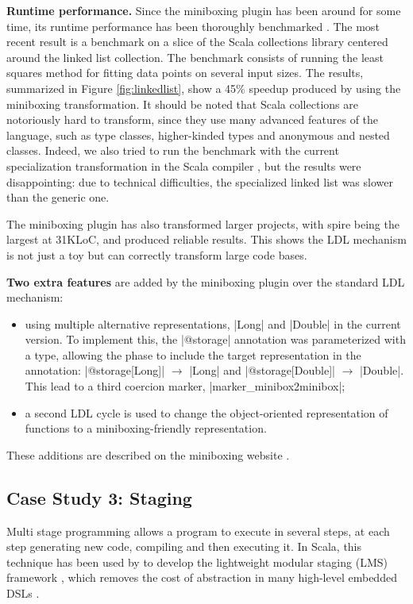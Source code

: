\textbf{Runtime performance.} Since the miniboxing plugin has been around for some time, its runtime performance has been thoroughly benchmarked \cite{miniboxing}. The most recent result is a benchmark on a slice of the Scala collections library \cite{miniboxing-linkedlist} centered around the linked list collection. The benchmark consists of running the least squares method for fitting data points on several input sizes. The results, summarized in Figure \ref{fig:linkedlist}, show a 45\% speedup produced by using the miniboxing transformation. It should be noted that Scala collections are notoriously hard to transform, since they use many advanced features of the language, such as type classes, higher-kinded types and anonymous and nested classes. Indeed, we also tried to run the benchmark with the current specialization transformation in the Scala compiler \cite{iuli-thesis}, but the results were disappointing: due to technical difficulties, the specialized linked list was slower than the generic one.

The miniboxing plugin \cite{miniboxing-www} has also transformed larger projects, with spire \cite{erik-spire} being the largest at 31KLoC, and produced reliable results. This shows the LDL mechanism is not just a toy but can correctly transform large code bases.

\textbf{Two extra features} are added by the miniboxing plugin over the standard LDL mechanism:
\begin{itemize}
\item using multiple alternative representations, |Long| and |Double| in the current version. To implement this, the |@storage| annotation was parameterized with a type, allowing the \inject{} phase to include the target representation in the annotation: |@storage[Long]| $\rightarrow$ |Long| and |@storage[Double]| $\rightarrow$ |Double|. This lead to a third coercion marker, |marker_minibox2minibox|;
\item a second LDL cycle is used to change the object-oriented representation of functions to a miniboxing-friendly representation.
\end{itemize}
These additions are described on the miniboxing website \cite{miniboxing-www}.

\subsection{Case Study 3: Staging}
\label{sec:validation/staging}
Multi stage programming \cite{taha-intro} allows a program to execute in several steps, at each step generating new code, compiling and then executing it. In Scala, this technique has been used by  to develop the lightweight modular staging (LMS) framework \cite{tiark-lms, tiark-building-blocks}, which removes the cost of abstraction in many high-level embedded DSLs \cite{tiark-thesis, staged-sac, nada-js,stucki-odds,ackermann-jet}.

